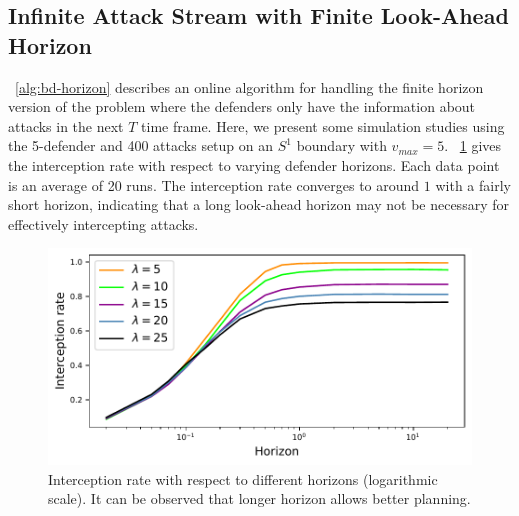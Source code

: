 \subsection{Infinite Attack Stream with Finite Look-Ahead Horizon}
~\ref{alg:bd-horizon} describes an online \ours algorithm for handling the finite horizon version of the problem where the defenders only have the information about attacks in the next $T$ time frame.
Here, we present some simulation studies using the 5-defender and 400 attacks setup on an $S^1$ boundary with $v_{max} = 5$. 
~\ref{fig:bd-horizon} gives the interception rate with respect to varying defender horizons. Each data point is an average of 20 runs. 
The interception rate converges to around $1$ with a fairly short horizon, 
indicating that a long look-ahead horizon may not be necessary for effectively intercepting attacks.
\begin{figure}
    \vspace{-1mm}
    \centering
    \includegraphics[width=0.6\linewidth]{chapters/bd/fig/horizon.pdf}
    \vspace{-2mm}
    \caption[Interception rate with respect to different horizons]{Interception rate with respect to different horizons (logarithmic scale). It can be observed that longer horizon allows better planning.}
    \label{fig:bd-horizon}
    \vspace{-3mm}
\end{figure}

